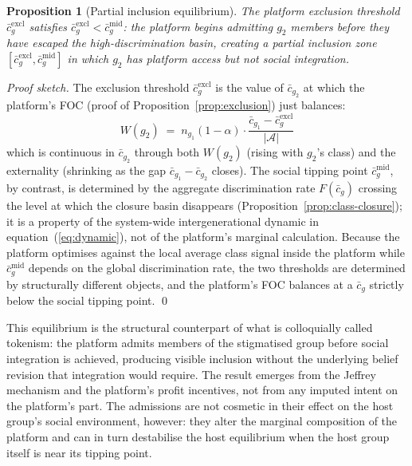 \documentclass[12pt,a4paper]{article}
\newtheorem{proposition}{Proposition}
\theoremstyle{definition}
\numberwithin{proposition}{subsection}
\begin{document}
\begin{proposition}[Partial inclusion equilibrium]
\label{prop:tokenism}
The platform exclusion threshold $\bar{c}_g^{\mathrm{excl}}$ satisfies
$\bar{c}_g^{\mathrm{excl}} < \bar{c}_g^{\mathrm{mid}}$: the platform begins
admitting $g_2$ members \emph{before} they have escaped the
high-discrimination basin, creating a partial inclusion zone
$[\bar{c}_g^{\mathrm{excl}}, \bar{c}_g^{\mathrm{mid}}]$ in which $g_2$ has
platform access but not social integration.
\end{proposition}

\begin{proof}[Proof sketch]
The exclusion threshold $\bar{c}_g^{\mathrm{excl}}$ is the value of
$\bar{c}_{g_2}$ at which the platform's FOC (proof of
Proposition~\ref{prop:exclusion}) just balances:
\[
  W(g_2) \;=\; n_{g_1} (1 - \alpha)
  \cdot \frac{\bar{c}_{g_1} - \bar{c}_g^{\mathrm{excl}}}{|\mathcal{A}|}
\]
which is continuous in $\bar{c}_{g_2}$ through both $W(g_2)$ (rising
with $g_2$'s class) and the externality (shrinking as the gap
$\bar{c}_{g_1} - \bar{c}_{g_2}$ closes). The social tipping point
$\bar{c}_g^{\mathrm{mid}}$, by contrast, is determined by the
aggregate discrimination rate $F(\bar{c}_g)$ crossing the level at
which the closure basin disappears
(Proposition~\ref{prop:class-closure}); it is a property of the
system-wide intergenerational dynamic
in equation~(\ref{eq:dynamic}), not of the platform's marginal
calculation. Because the platform optimises against the local
average class signal inside the platform while
$\bar{c}_g^{\mathrm{mid}}$ depends on the global discrimination
rate, the two thresholds are determined by structurally different
objects, and the platform's FOC balances at a $\bar{c}_g$ strictly
below the social tipping point. \qed
\end{proof}

This equilibrium is the structural counterpart of what is
colloquially called tokenism: the platform admits members of the
stigmatised group before social integration is achieved, producing
visible inclusion without the underlying belief revision that
integration would require. The result emerges from the Jeffrey
mechanism and the platform's profit incentives, not from any
imputed intent on the platform's part. The admissions are not
cosmetic in their effect on the host group's social environment,
however: they alter the marginal composition of the platform and
can in turn destabilise the host equilibrium when the host group
itself is near its tipping point.
\end{document}
